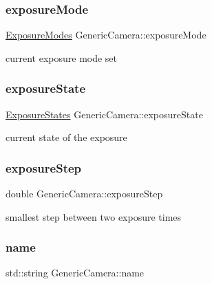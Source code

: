 \subsubsection{\texorpdfstring{exposure\+Mode}{exposureMode}}
{\footnotesize\ttfamily \hyperlink{constants_8h_a6e920987695b1da6e2df4e41dc867e18}{Exposure\+Modes} Generic\+Camera\+::exposure\+Mode\hspace{0.3cm}{\ttfamily [protected]}}



current exposure mode set 

\mbox{\label{class_generic_camera_a92600846c7691baabbc78af3b6e1cb67}} 
\subsubsection{\texorpdfstring{exposure\+State}{exposureState}}
{\footnotesize\ttfamily \hyperlink{constants_8h_ae9749bac8d6973b92725af092d0a76bc}{Exposure\+States} Generic\+Camera\+::exposure\+State\hspace{0.3cm}{\ttfamily [protected]}}



current state of the exposure 

\mbox{\label{class_generic_camera_a1d0a61c9839147adaa86e9c456e3ce0c}} 
\subsubsection{\texorpdfstring{exposure\+Step}{exposureStep}}
{\footnotesize\ttfamily double Generic\+Camera\+::exposure\+Step\hspace{0.3cm}{\ttfamily [protected]}}



smallest step between two exposure times 

\mbox{\label{class_generic_camera_a12b86f8137447dd8af1864eb9bb062ee}} 
\subsubsection{\texorpdfstring{name}{name}}
{\footnotesize\ttfamily std\+::string Generic\+Camera\+::name\hspace{0.3cm}{\ttfamily [protected]}}



